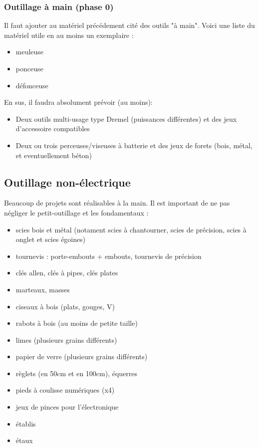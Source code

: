 \subsubsection{Outillage à main (phase 0)}

Il faut ajouter au matériel précédement cité des outils "à main". Voici une liste du matériel utile en au moins un
exemplaire :

\begin{itemize}
	\item meuleuse
	\item ponceuse
	\item défonceuse
\end{itemize}

En sus, il faudra absolument prévoir (au moins):

\begin{itemize}
	\item Deux outils multi-usage type Dremel (puissances différentes) et des jeux d'accessoire compatibles
	\item Deux ou trois perceuses/viseuses à batterie et des jeux de forets (bois, métal, et eventuellement béton)
\end{itemize}

\subsection{Outillage non-électrique}

Beaucoup de projets sont réalisables à la main. Il est important de ne pas négliger le petit-outillage et les
fondamentaux :

\begin{itemize}
	\item scies bois et métal (notament scies à chantourner, scies de précision, scies à onglet et scies égoines)
	\item tournevis : porte-embouts + embouts, tournevis de précision
	\item clés allen, clés à pipes, clés plates
	\item marteaux, masses
	\item ciseaux à bois (plats, gouges, V)
	\item rabots à bois (au moins de petite taille)
	\item limes (plusieurs grains différents)
	\item papier de verre (plusieurs grains différents)
	\item règlets (en 50cm et en 100cm), équerres
	\item pieds à coulisse numériques (x4)
	\item jeux de pinces pour l'électronique
	\item établis
	\item étaux
\end{itemize}

